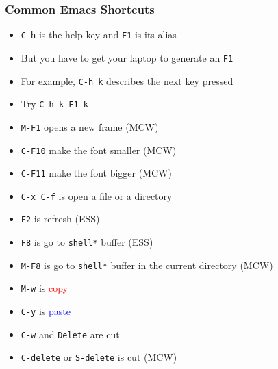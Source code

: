 \documentclass[11pt,pdftex,dvipsnames,usenames,helvetica]{beamer}
\begin{document}
\begin{frame}
\frametitle{Common Emacs Shortcuts}

\begin{itemize}
\item {\tt C-h} is the help key and {\tt F1} is its alias
\item But you have to get your laptop to generate an {\tt F1}
\item For example, {\tt C-h k} describes the next key pressed
\item Try {\tt C-h k F1 k}
\item {\tt M-F1} opens a new frame (MCW)
\item {\tt C-F10} make the font smaller (MCW)
\item {\tt C-F11} make the font bigger (MCW)
\item {\tt C-x C-f} is open a file or a directory
\item {\tt F2} is refresh (ESS)
\item {\tt F8} is go to {\tt *shell*} buffer (ESS)
\item {\tt M-F8} is go to {\tt *shell*} buffer in the current directory (MCW)
\item {\tt M-w} is \textcolor{red}{copy}
\item {\tt C-y} is \textcolor{blue}{paste}
\item {\tt C-w} and {\tt Delete} are cut 
\item {\tt C-delete} or {\tt S-delete} is cut (MCW)

\end{itemize}

\end{frame}
\end{document}
